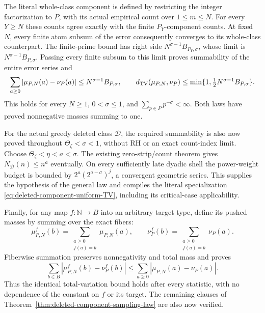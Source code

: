 \documentclass[11pt]{article}
\theoremstyle{definition}
\begin{document}
The literal whole-class component is defined by restricting the
integer factorization to \(P\), with its actual empirical count over
\(1\le m\le N\). For every \(Y\ge N\) these counts agree exactly
with the finite \(P_Y\)-component counts. At fixed \(N\), every finite
atom subsum of the error consequently converges to its whole-class
counterpart. The finite-prime bound has right side
\(N^{\sigma-1}B_{P_Y,\sigma}\), whose limit is
\(N^{\sigma-1}B_{P,\sigma}\). Passing every finite subsum to this
limit proves summability of the entire error series and
\[
 \sum_{a\ge0}|\mu_{P,N}(a)-\nu_P(a)|
       \le N^{\sigma-1}B_{P,\sigma},
 \qquad
 d_{\rm TV}(\mu_{P,N},\nu_P)
       \le\min\{1,\tfrac12N^{\sigma-1}B_{P,\sigma}\}.
\]
This holds for every \(N\ge1\), \(0<\sigma\le1\), and
\(\sum_{p\in P}p^{-\sigma}<\infty\).
Both laws have proved nonnegative masses summing to one.

For the actual greedy deleted class \(\mathcal D\), the required
summability is also now proved throughout
\(\Theta_\zeta<\sigma<1\), without RH or an exact count-index limit.
Choose \(\Theta_\zeta<\eta<a<\sigma\).
The existing zero-strip/count theorem gives
\(N_{\mathcal D}(n)\le n^a\) eventually.
On every sufficiently late dyadic shell the power-weight budget is
bounded by
\(2^a(2^{a-\sigma})^j\), a convergent geometric series.
This supplies the hypothesis of the general law and compiles the
literal specialization \eqref{eq:deleted-component-uniform-TV},
including its critical-case applicability.

Finally, for any map \(f:\mathbb N\to B\) into an arbitrary target
type, define its pushed masses by summing over the exact fibers:
\[
 \mu^f_{P,N}(b)=\sum_{\substack{a\ge0\\f(a)=b}}\mu_{P,N}(a),
 \qquad
 \nu^f_P(b)=\sum_{\substack{a\ge0\\f(a)=b}}\nu_P(a).
\]
Fiberwise summation preserves nonnegativity and total mass and proves
\[
 \sum_{b\in B}|\mu^f_{P,N}(b)-\nu^f_P(b)|
       \le\sum_{a\ge0}|\mu_{P,N}(a)-\nu_P(a)|.
\]
Thus the identical total-variation bound holds after every statistic,
with no dependence of the constant on \(f\) or its target.
The remaining clauses of Theorem~\ref{thm:deleted-component-sampling-law}
are also now verified.
\end{document}
